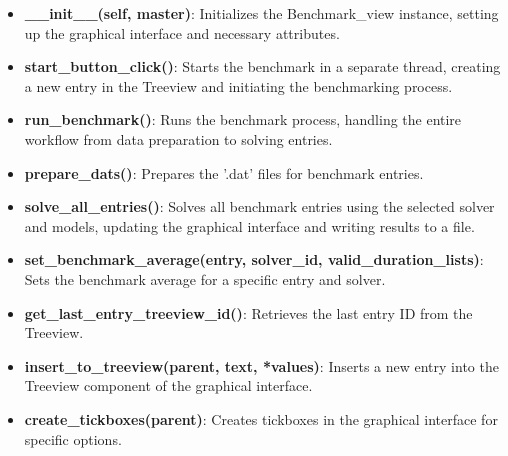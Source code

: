\begin{itemize}
    \item \textbf{\_\_init\_\_(self, master)}: Initializes the Benchmark\_view instance, setting up the graphical interface and necessary attributes.
    \item \textbf{start\_button\_click()}: Starts the benchmark in a separate thread, creating a new entry in the Treeview and initiating the benchmarking process.
    \item \textbf{run\_benchmark()}: Runs the benchmark process, handling the entire workflow from data preparation to solving entries.
    \item \textbf{prepare\_dats()}: Prepares the '.dat' files for benchmark entries.
    \item \textbf{solve\_all\_entries()}: Solves all benchmark entries using the selected solver and models, updating the graphical interface and writing results to a file.
    \item \textbf{set\_benchmark\_average(entry, solver\_id, valid\_duration\_lists)}: Sets the benchmark average for a specific entry and solver.
    \item \textbf{get\_last\_entry\_treeview\_id()}: Retrieves the last entry ID from the Treeview.
    \item \textbf{insert\_to\_treeview(parent, text, *values)}: Inserts a new entry into the Treeview component of the graphical interface.
    \item \textbf{create\_tickboxes(parent)}: Creates tickboxes in the graphical interface for specific options.
\end{itemize}

